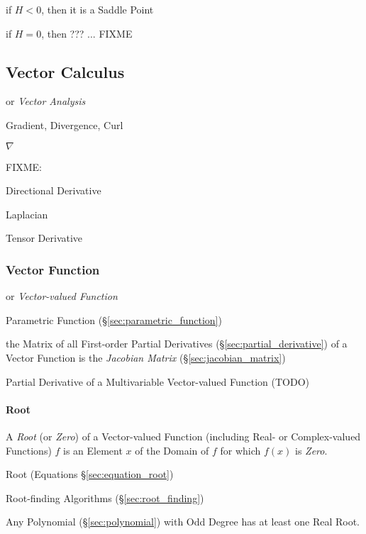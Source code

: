 if $H < 0$, then it is a Saddle Point

if $H = 0$, then ??? ... FIXME



\subsection{Vector Calculus}\label{sec:vector_calclulus}

or \emph{Vector Analysis}

Gradient, Divergence, Curl

$\nabla$

FIXME:

Directional Derivative

Laplacian

Tensor Derivative



\subsubsection{Vector Function}\label{sec:vector_function}

or \emph{Vector-valued Function}

\fist Parametric Function (\S\ref{sec:parametric_function})

the Matrix of all First-order Partial Derivatives
(\S\ref{sec:partial_derivative}) of a Vector Function is the \emph{Jacobian
  Matrix} (\S\ref{sec:jacobian_matrix})

Partial Derivative of a Multivariable Vector-valued Function (TODO)



\paragraph{Root}\label{sec:function_root}\hfill

A \emph{Root} (or \emph{Zero}) of a Vector-valued Function (including Real- or
Complex-valued Functions) $f$ is an Element $x$ of the Domain of $f$ for which
$f(x)$ is \emph{Zero}.

\fist Root (Equations \S\ref{sec:equation_root})

\fist Root-finding Algorithms (\S\ref{sec:root_finding})

Any Polynomial (\S\ref{sec:polynomial}) with Odd Degree has at least
one Real Root.

